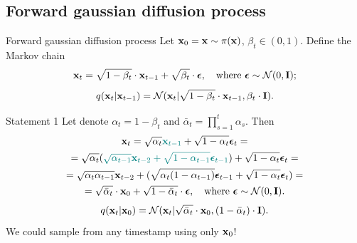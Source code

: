 \subsection{Forward gaussian diffusion process}
\begin{frame}{Forward gaussian diffusion process}
	Let $\mathbf{x}_0 = \mathbf{x} \sim \pi(\mathbf{x})$, $\beta_t \in (0, 1)$. Define the Markov chain
	\[
		\mathbf{x}_t = \sqrt{1 - \beta_t} \cdot \mathbf{x}_{t - 1} + \sqrt{\beta_t} \cdot \boldsymbol{\epsilon}, \quad \text{where }\boldsymbol{\epsilon} \sim \mathcal{N}(0, \mathbf{I});
	\]
	\[
		q(\mathbf{x}_t | \mathbf{x}_{t-1}) = \mathcal{N}(\mathbf{x}_t | \sqrt{1 - \beta_t} \cdot \mathbf{x}_{t-1}, \beta_t \cdot \mathbf{I}).
	\]
	\vspace{-0.5cm}
	\begin{block}{Statement 1}
		Let denote $\alpha_t = 1 - \beta_t$ and $\bar{\alpha}_t = \prod_{s=1}^t \alpha_s$. Then
		\vspace{-0.2cm}
		\begin{multline*}
			\mathbf{x}_t = \sqrt{\alpha_t} {\color{teal}\mathbf{x}_{t-1}} + \sqrt{1 - \alpha_t} \boldsymbol{\epsilon}_t = \\
			= \sqrt{\alpha_t} ({\color{teal} \sqrt{\alpha_{t-1}} \mathbf{x}_{t-2} + \sqrt{1 - \alpha_{t-1}} \boldsymbol{\epsilon}_{t-1}}) + \sqrt{1 - \alpha_t} \boldsymbol{\epsilon}_t = \\
			= \sqrt{\alpha_t \alpha_{t-1}} \mathbf{x}_{t-2} + ( \sqrt{\alpha_t (1 - \alpha_{t-1})}  \boldsymbol{\epsilon}_{t-1} + \sqrt{1 - \alpha_t} \boldsymbol{\epsilon}_t) = \\
			= \sqrt{\bar{\alpha}_t} \cdot \mathbf{x}_{0} + \sqrt{1 - \bar{\alpha}_t} \cdot \boldsymbol{\epsilon}, \quad \text{where } \boldsymbol{\epsilon} \sim \mathcal{N}(0, \mathbf{I}).
		\end{multline*}
		\vspace{-0.4cm}
		\[
			q(\mathbf{x}_t | \mathbf{x}_0) = \mathcal{N}(\mathbf{x}_t | \sqrt{\bar{\alpha}_t} \cdot \mathbf{x}_0, (1 - \bar{\alpha}_t) \cdot \mathbf{I}).
		\]
		We could sample from any timestamp using only $\mathbf{x}_0$!
	\end{block}
 \end{frame}
